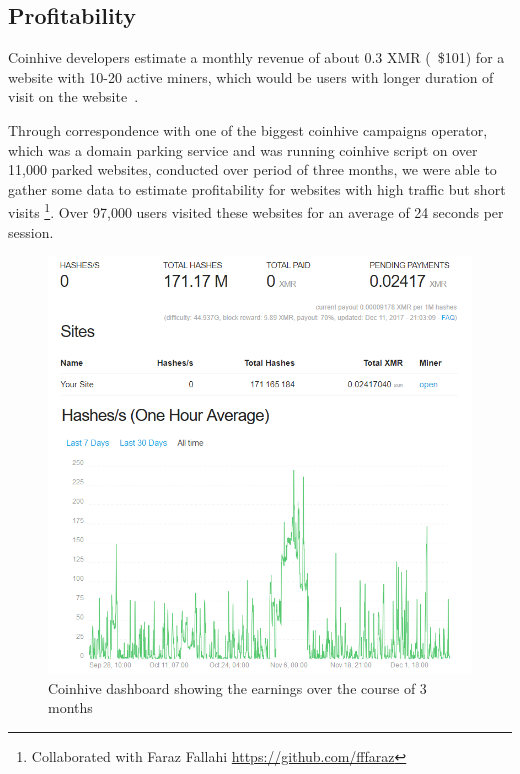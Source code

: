 \subsection{Profitability}
\label{profitabilitexperiment}

Coinhive developers estimate a monthly revenue of about 0.3 XMR (~\$101) for a website with 10-20 active miners, which would be users with longer duration of visit on the website~\cite{coinhive}.

Through correspondence with one of the biggest coinhive campaigns operator, which was a domain parking service and was running coinhive script on over 11,000 parked websites, conducted over period of three months, we were able to gather some data to estimate profitability for websites with high traffic but short visits \footnote{Collaborated with Faraz Fallahi \url{https://github.com/fffaraz}}. Over 97,000 users visited these websites for an average of 24 seconds per session.


\begin{figure}[t]
\centering
\includegraphics[width=\linewidth]{figures/experiment_coinhive_results.png}
\caption{Coinhive dashboard showing the earnings over the course of 3 months}
\end{figure}



